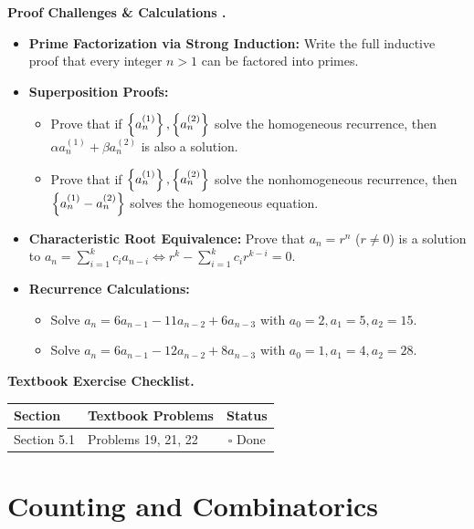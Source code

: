 \documentclass{natsirt}
\newcounter{topic}[section]
\newenvironment{challengebox}[1][]{%
    \begin{redbox}[#1]\refstepcounter{topic}\textbf{Proof Challenges \& Calculations \thesection.\thetopic}%
}{\end{redbox}}
\newenvironment{reviewbox}[1][]{\begin{whitebox}[#1]\textbf{Textbook Exercise Checklist. }}{\end{whitebox}}
\newcommand{\citem}{\item[$\square$]}
\begin{document}
\begin{challengebox}
    \begin{itemize}
        \citem \textbf{Prime Factorization via Strong Induction:} Write the full inductive proof that every integer $n > 1$ can be factored into primes.
        \citem \textbf{Superposition Proofs:}
        \begin{itemize}
            \item Prove that if $\left\{ a_n^{(1)} \right\}, \left\{ a_n^{(2)} \right\}$ solve the homogeneous recurrence, then $\alpha a_n^{(1)} + \beta a_n^{(2)}$ is also a solution.
            \item Prove that if $\left\{ a_n^{(1)} \right\}, \left\{ a_n^{(2)} \right\}$ solve the nonhomogeneous recurrence, then $\left\{ a_n^{(1)} - a_n^{(2)} \right\}$ solves the homogeneous equation.
        \end{itemize}
        \citem \textbf{Characteristic Root Equivalence:} Prove that $a_n = r^n$ ($r \neq 0$) is a solution to $a_n = \sum_{i=1}^k c_i a_{n-i} \iff r^k - \sum_{i=1}^k c_i r^{k-i} = 0$.
        \citem \textbf{Recurrence Calculations:}
        \begin{itemize}
            \item Solve $a_n = 6a_{n-1} - 11a_{n-2} + 6a_{n-3}$ with $a_0 = 2, a_1 = 5, a_2 = 15$.
            \item Solve $a_n = 6a_{n-1} - 12a_{n-2} + 8a_{n-3}$ with $a_0 = 1, a_1 = 4, a_2 = 28$.
        \end{itemize}
    \end{itemize}
\end{challengebox}

\begin{reviewbox}
    \begin{center}
    \begin{tabular}{|l|l|c|}
        \hline
        \textbf{Section} & \textbf{Textbook Problems} & \textbf{Status} \\
        \hline
        Section 5.1 & Problems 19, 21, 22 & $\square$ Done \\
        \hline
    \end{tabular}
    \end{center}
\end{reviewbox}


\section{Counting and Combinatorics}
\end{document}
